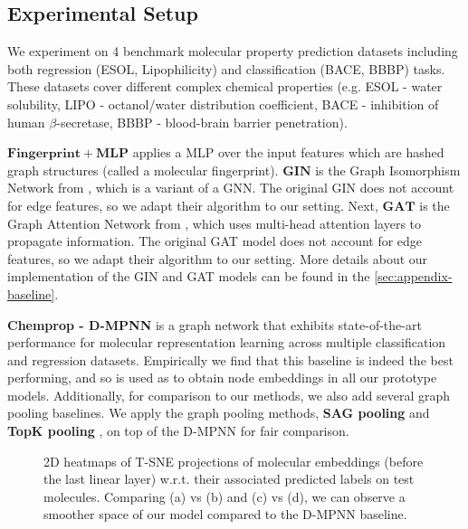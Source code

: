 \documentclass[letterpaper]{article} \usepackage{aaai22}  \usepackage{times}  \usepackage{helvet}  \usepackage{courier}  \usepackage[hyphens]{url}  \usepackage{graphicx} \urlstyle{rm} \def\UrlFont{\rm}  \usepackage{natbib}  \usepackage{caption} \DeclareCaptionStyle{ruled}{labelfont=normalfont,labelsep=colon,strut=off} \frenchspacing  \setlength{\pdfpagewidth}{8.5in}  \setlength{\pdfpageheight}{11in}  \usepackage{algorithm}
\begin{document}
\subsection{Experimental Setup}
We experiment on 4 benchmark molecular property prediction datasets \citep{yang2019analyzing} including both regression (ESOL, Lipophilicity) and classification (BACE, BBBP) tasks. These datasets cover different complex chemical properties (e.g. ESOL - water solubility, LIPO - octanol/water distribution coefficient, BACE - inhibition of human $\beta$-secretase, BBBP - blood-brain barrier penetration). 

\noindent\textbf{$\mathbf{Fingerprint + MLP}$} applies a MLP over the input features which are hashed graph structures (called a molecular fingerprint). \textbf{$\mathbf{GIN}$} is the Graph Isomorphism Network from \citep{xu2018powerful}, which is a variant of a GNN. The original GIN does not account for edge features, so we adapt their algorithm to our setting. Next, \textbf{$\mathbf{GAT}$} is the Graph Attention Network from \citep{velivckovic2017graph}, which uses multi-head attention layers to propagate information. The original GAT model does not account for edge features, so we adapt their algorithm to our setting. More details about our implementation of the GIN and GAT models can be found in the \cref{sec:appendix-baseline}. 

\textbf{Chemprop - D-MPNN} \citep{yang2019analyzing} is a graph network that exhibits state-of-the-art performance for molecular representation learning across multiple classification and regression datasets. Empirically we find that this baseline is indeed the best performing, and so is used as to obtain node embeddings in all our prototype models. Additionally, for comparison to our methods, we also add several graph pooling baselines. We apply the graph pooling methods, \textbf{SAG pooling} \citep{lee2019self} and \textbf{TopK pooling} \citep{gao2019graph}, on top of the D-MPNN for fair comparison. 

\begin{figure}[t]
    \centering
  \caption{2D heatmaps of T-SNE projections of molecular embeddings (before the last linear layer) w.r.t. their associated predicted labels on test molecules. Comparing (a) vs (b) and (c) vs (d), we can observe a smoother space of our model compared to the D-MPNN baseline.  \vspace{-0.3cm}}
    \label{fig:embedding_space}
\end{figure}
\end{document}
